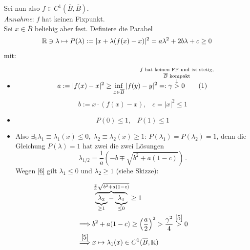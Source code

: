 \documentclass[a4paper]{article}
\begin{document}
\begin{Beweis}
Sei nun also $f\in C^1(\overline{B},\overline{B})$.\\
\textit{Annahme}: $f$ hat keinen Fixpunkt.\\
Sei $x\in\overline{B}$ beliebig aber fest. Definiere die Parabel
\[\mathbb R\ni \lambda\mapsto P(\lambda):=|x+\lambda(f(x)-x)|^2=a\lambda^2+2b\lambda+c\ge0\]mit:
\begin{itemize}
\item \[a:=|f(x)-x|^2\ge \inf_{x\in\overline{B}}|f(y)-y|^2=:\gamma\overset{\mathclap{\substack{f\te{hat keinen FP und ist stetig},\\ \overline{B}\te{kompakt}\\ \downarrow}}}{>}0\tag{$1$}\label{5}\]
\[b:=x\cdot (f(x)-x),\;\;\;c=|x|^2\le 1\]
\item \[P(0)\le 1,\;\;\;P(1)\le 1\tag{$2$}\label{6}\]
\item Also $\exists_1\lambda_1\equiv \lambda_1(x)\le 0,\;\lambda_2\equiv \lambda_2(x)\ge 1$: $P(\lambda_1)=P(\lambda_2)=1$, denn die Gleichung $P(\lambda)=1$ hat zwei die zwei Lösungen
\[\lambda_{1/2}=\frac{1}{a}\left(-b\mp\sqrt{b^2+a(1-c)}\right)\,.\]
Wegen \eqref{6} gilt $\lambda_1\le 0$ und $\lambda_2\ge 1$ (siehe Skizze):\\
\begin{minipage}{0.5\textwidth}
\begin{center}
\end{center}
\end{minipage}
\begin{minipage}{0.49\textwidth}
\begin{align*}
&\overbrace{\underbrace{\lambda_2}_{\ge 1}-\underbrace{\lambda_1}_{\le 0}}^{\frac{2}{a}\sqrt{b^2+a(1-c)}}\ge 1\\
\implies& b^2+a(1-c)\ge \left(\frac{a}{2}\right)^2>\frac{\gamma^2}{4}\overset{\eqref{5}}{>}0 \\
\overset{\eqref{5}}{\implies}& x\mapsto \lambda_1(x)\in C^1(\overline{B},\RR)

\end{align*}
\end{minipage}
\end{itemize}
\end{Beweis}
\end{document}
